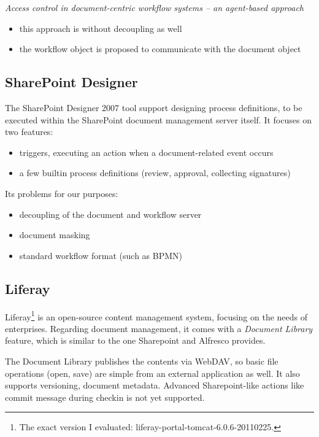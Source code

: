 \emph{Access control in document-centric workflow systems -- an agent-based approach}\cite{paper-access}
\begin{itemize}
\item this approach is without decoupling as well
\item the workflow object is proposed to communicate with the document object
\end{itemize}

\subsection*{SharePoint Designer}

The SharePoint Designer\cite{sp-designer} 2007 tool support designing process definitions, to
be executed within the SharePoint document management server itself. It focuses on two features:

\begin{itemize}
\item triggers, executing an action when a document-related event occurs
\item a few builtin process definitions (review, approval, collecting signatures)
\end{itemize}

Its problems for our purposes:

\begin{itemize}
\item decoupling of the document and workflow server
\item document masking
\item standard workflow format (such as BPMN)
\end{itemize}

\subsection*{Liferay}

Liferay\cite{liferay}\footnote{The exact version I evaluated:
liferay-portal-tomcat-6.0.6-20110225.} is an open-source content management
system, focusing on the needs of enterprises. Regarding document management, it
comes with a \emph{Document Library} feature, which is similar to the one
Sharepoint and Alfresco provides.

The Document Library publishes the contents via WebDAV, so basic file
operations (open, save) are simple from an external application as well. It
also supports versioning, document metadata. Advanced Sharepoint-like actions
like commit message during checkin is not yet supported.

